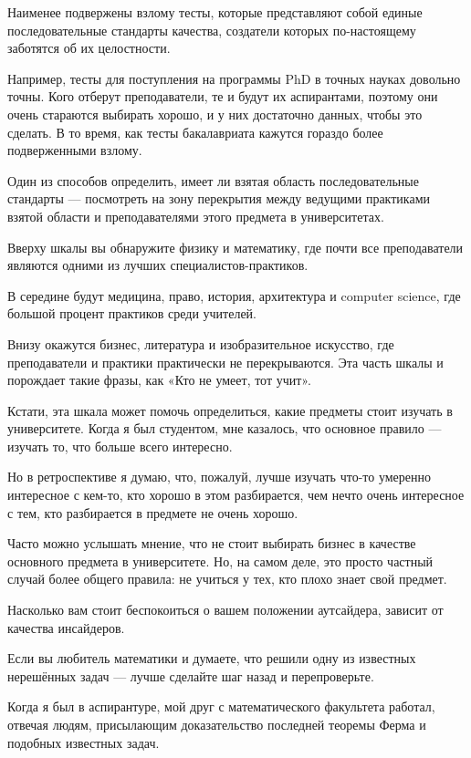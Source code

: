 \documentclass[ebook,12pt,oneside,openany]{memoir}
\begin{document}
Наименее подвержены взлому тесты, которые представляют собой единые
последовательные стандарты качества, создатели которых по-настоящему
заботятся об их целостности.

Например, тесты для поступления на программы PhD в точных науках
довольно точны. Кого отберут преподаватели, те и будут их аспирантами,
поэтому они очень стараются выбирать хорошо, и у них достаточно
данных, чтобы это сделать. В то время, как тесты бакалавриата кажутся
гораздо более подверженными взлому.

Один из способов определить, имеет ли взятая область последовательные
стандарты — посмотреть на зону перекрытия между ведущими практиками
взятой области и преподавателями этого предмета в университетах.

Вверху шкалы вы обнаружите физику и математику, где почти все
преподаватели являются одними из лучших специалистов-практиков.

В середине будут медицина, право, история, архитектура и computer
science, где большой процент практиков среди учителей.

Внизу окажутся бизнес, литература и изобразительное искусство, где
преподаватели и практики практически не перекрываются. Эта часть шкалы
и порождает такие фразы, как «Кто не умеет, тот учит».

Кстати, эта шкала может помочь определиться, какие предметы стоит
изучать в университете. Когда я был студентом, мне казалось, что
основное правило — изучать то, что больше всего интересно.

Но в ретроспективе я думаю, что, пожалуй, лучше изучать что-то
умеренно интересное с кем-то, кто хорошо в этом разбирается, чем нечто
очень интересное с тем, кто разбирается в предмете не очень хорошо.

Часто можно услышать мнение, что не стоит выбирать бизнес в качестве
основного предмета в университете. Но, на самом деле, это просто
частный случай более общего правила: не учиться у тех, кто плохо знает
свой предмет.

Насколько вам стоит беспокоиться о вашем положении аутсайдера, зависит
от качества инсайдеров.

Если вы любитель математики и думаете, что решили одну из известных
нерешённых задач — лучше сделайте шаг назад и перепроверьте.

Когда я был в аспирантуре, мой друг с математического факультета
работал, отвечая людям, присылающим доказательство последней теоремы
Ферма и подобных известных задач.
\end{document}
